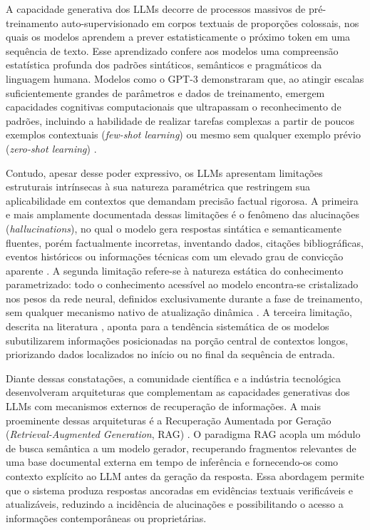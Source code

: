 \documentclass[
	12pt,				%
	openright,			%
	oneside,			%
	a4paper,			%
	tccpreliminar,		%
	]{ABNT-DC-UEL}
\begin{document}
A capacidade generativa dos LLMs decorre de processos massivos de pré-treinamento auto-supervisionado em corpos textuais de proporções colossais, nos quais os modelos aprendem a prever estatisticamente o próximo token em uma sequência de texto. Esse aprendizado confere aos modelos uma compreensão estatística profunda dos padrões sintáticos, semânticos e pragmáticos da linguagem humana. Modelos como o GPT-3 \cite{brown2020fewshot} demonstraram que, ao atingir escalas suficientemente grandes de parâmetros e dados de treinamento, emergem capacidades cognitivas computacionais que ultrapassam o reconhecimento de padrões, incluindo a habilidade de realizar tarefas complexas a partir de poucos exemplos contextuais (\textit{few-shot learning}) ou mesmo sem qualquer exemplo prévio (\textit{zero-shot learning}) \cite{wei2022emergent}.

Contudo, apesar desse poder expressivo, os LLMs apresentam limitações estruturais intrínsecas à sua natureza paramétrica que restringem sua aplicabilidade em contextos que demandam precisão factual rigorosa. A primeira e mais amplamente documentada dessas limitações é o fenômeno das alucinações (\textit{hallucinations}), no qual o modelo gera respostas sintática e semanticamente fluentes, porém factualmente incorretas, inventando dados, citações bibliográficas, eventos históricos ou informações técnicas com um elevado grau de convicção aparente \cite{ji2023hallucination}. A segunda limitação refere-se à natureza estática do conhecimento parametrizado: todo o conhecimento acessível ao modelo encontra-se cristalizado nos pesos da rede neural, definidos exclusivamente durante a fase de treinamento, sem qualquer mecanismo nativo de atualização dinâmica \cite{lewis2020rag}. A terceira limitação, descrita na literatura \cite{liu2023lostmiddle}, aponta para a tendência sistemática de os modelos subutilizarem informações posicionadas na porção central de contextos longos, priorizando dados localizados no início ou no final da sequência de entrada.

Diante dessas constatações, a comunidade científica e a indústria tecnológica desenvolveram arquiteturas que complementam as capacidades generativas dos LLMs com mecanismos externos de recuperação de informações. A mais proeminente dessas arquiteturas é a Recuperação Aumentada por Geração (\textit{Retrieval-Augmented Generation}, RAG) \cite{lewis2020rag}. O paradigma RAG acopla um módulo de busca semântica a um modelo gerador, recuperando fragmentos relevantes de uma base documental externa em tempo de inferência e fornecendo-os como contexto explícito ao LLM antes da geração da resposta. Essa abordagem permite que o sistema produza respostas ancoradas em evidências textuais verificáveis e atualizáveis, reduzindo a incidência de alucinações e possibilitando o acesso a informações contemporâneas ou proprietárias.
\end{document}
